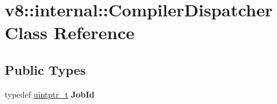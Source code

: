 \hypertarget{classv8_1_1internal_1_1CompilerDispatcher}{}\section{v8\+:\+:internal\+:\+:Compiler\+Dispatcher Class Reference}
\label{classv8_1_1internal_1_1CompilerDispatcher}
\subsection*{Public Types}
\begin{DoxyCompactItemize}
\item 
\mbox{\label{classv8_1_1internal_1_1CompilerDispatcher_ac831f25436eaf5a81895d004f5595efb}} 
typedef \mbox{\hyperlink{classuintptr__t}{uintptr\+\_\+t}} {\bfseries Job\+Id}
\end{DoxyCompactItemize}
